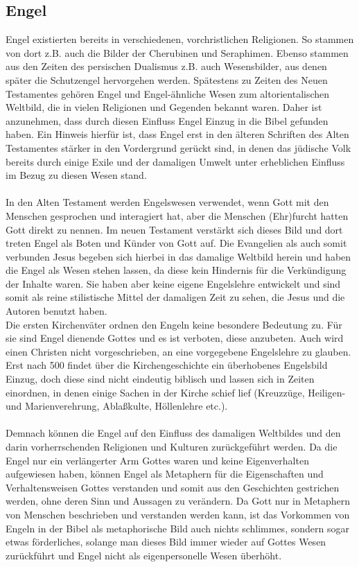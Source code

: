 \subsection{Engel}
Engel existierten bereits in verschiedenen, vorchristlichen Religionen. So stammen von dort z.B. auch die Bilder der Cherubinen und Seraphimen. Ebenso
stammen aus den Zeiten des persischen Dualismus z.B. auch Wesensbilder, aus denen später die Schutzengel hervorgehen werden. Spätestens zu 
Zeiten des Neuen Testamentes gehören Engel und Engel-ähnliche Wesen zum altorientalischen Weltbild, die in vielen Religionen und Gegenden bekannt 
waren. Daher ist anzunehmen, dass durch diesen Einfluss Engel Einzug in die Bibel gefunden haben. Ein Hinweis hierfür ist, dass Engel erst in den älteren 
Schriften des Alten Testamentes stärker in den Vordergrund gerückt sind, in denen das jüdische Volk bereits durch einige Exile und der damaligen Umwelt
unter erheblichen Einfluss im Bezug zu diesen Wesen stand.
\\~\\
In den Alten Testament werden Engelswesen verwendet, wenn Gott mit den Menschen gesprochen und interagiert hat, aber die Menschen (Ehr)furcht hatten
Gott direkt zu nennen. Im neuen Testament verstärkt sich dieses Bild und dort treten Engel als Boten und Künder von Gott auf.  Die Evangelien als auch somit
verbunden Jesus begeben sich hierbei in das damalige Weltbild herein und haben die Engel als Wesen stehen lassen, da diese kein Hindernis für die Verkündigung
der Inhalte waren. Sie haben aber keine eigene Engelslehre entwickelt und sind somit als reine stilistische Mittel der damaligen Zeit zu sehen, die Jesus und die 
Autoren benutzt haben. \\Die ersten Kirchenväter ordnen den Engeln keine besondere Bedeutung zu. Für sie sind Engel dienende Gottes und es ist verboten, 
diese anzubeten. Auch wird einen Christen nicht vorgeschrieben, an eine vorgegebene Engelslehre zu glauben. Erst nach 500 findet über die Kirchengeschichte 
ein überhobenes Engelsbild Einzug, doch diese sind nicht eindeutig biblisch und lassen sich in Zeiten einordnen, in denen einige Sachen in der Kirche schief lief
 (Kreuzzüge, Heiligen- und Marienverehrung, Ablaßkulte, Höllenlehre etc.). 
\\~\\
Demnach können die Engel auf den Einfluss des damaligen Weltbildes und den darin vorherrschenden Religionen und Kulturen zurückgeführt werden. Da 
die Engel nur ein verlängerter Arm Gottes waren und keine Eigenverhalten aufgewiesen haben, können Engel als Metaphern für die Eigenschaften und 
Verhaltensweisen Gottes verstanden und somit aus den Geschichten gestrichen werden, ohne deren Sinn und Aussagen zu verändern. Da Gott nur in Metaphern
von Menschen beschrieben und verstanden werden kann, ist das Vorkommen von Engeln in der Bibel als metaphorische Bild auch nichts schlimmes, sondern 
sogar etwas förderliches, solange man dieses Bild immer wieder auf Gottes Wesen zurückführt und Engel nicht als eigenpersonelle Wesen überhöht.

